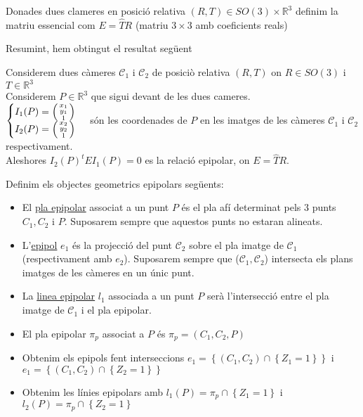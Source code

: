 \documentclass[../main.tex]{subfiles}
\begin{document}
	\begin{definicio}
		Donades dues clameres en posició relativa $(R, T) \in SO(3)\times\mathbb{R}^3$ definim la matriu essencial com $E = \hat{T}R$ (matriu $3\times3$ amb coeficients reals)
	\end{definicio}
	Resumint, hem obtingut el resultat següent
	\begin{teorema}
		Considerem dues càmeres $\mathcal{C}_1$ i $\mathcal{C}_2$ de posiciò relativa $(R,T)$ on $R \in SO(3)$ i $T \in \mathbb{R}^3$\\
		Considerem $P \in \mathbb{R}^3$ que sigui devant de les dues cameres.\\
		$\begin{cases}I_1(P) = \begin{psmallmatrix}x_1\\y_1\\1\end{psmallmatrix}\\I_2(P) = \begin{psmallmatrix}x_2\\y_2\\1\end{psmallmatrix}\end{cases}$ són les coordenades de $P$ en les imatges de les càmeres $\mathcal{C}_1$ i $\mathcal{C}_2$ respectivament.\\
		Aleshores $I_2(P)^tEI_1(P) = 0$ es la relació epipolar, on $E = \hat{T}R$.
	\end{teorema}
	\begin{definicio}
		Definim els objectes geometrics epipolars següents:
		\begin{itemize}
			\item El \underline{pla epipolar} associat a un punt $P$ és el pla afí determinat pels $3$ punts $C_1, C_2$ i $P$. Suposarem sempre que aquestos punts no estaran alineats.
			\item L'\underline{epipol} $e_1$ és la projecció del punt $\mathcal{C}_2$ sobre el pla imatge de $\mathcal{C}_1$ (respectivament amb $e_2$). Suposarem sempre que ($\mathcal{C}_1, \mathcal{C}_2$) intersecta els plans imatges de les càmeres en un únic punt.
			\item La \underline{linea epipolar} $l_1$ associada a un punt $P$ serà l'intersecció entre el pla imatge de $\mathcal{C}_1$ i el pla epipolar.
		\end{itemize}
	\end{definicio}
	\begin{obs}
		\begin{itemize}
			\item El pla epipolar $\pi_p$ associat a $P$ és $\pi_p = (C_1, C_2, P)$
			\item Obtenim els epipols fent interseccions $e_1 = \left\{(C_1, C_2) \cap \left\{Z_1 = 1\right\}\right\}$ i $e_1 = \left\{(C_1, C_2) \cap \left\{Z_2 = 1\right\}\right\}$
			\item Obtenim les línies epipolars amb $l_1(P) = \pi_p \cap \left\{Z_1 = 1\right\}$ i $l_2(P) = \pi_p \cap \left\{Z_2 = 1\right\}$
		\end{itemize}
	\end{obs}
\end{document}
